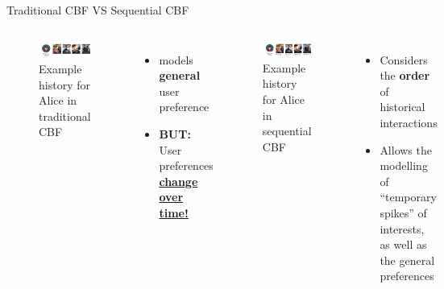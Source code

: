 \documentclass[en]{sdqbeamer}
\begin{document}
\begin{frame}{Traditional CBF VS Sequential CBF}
	\begin{columns}
		\begin{figure}
			\includegraphics[width=\textwidth]{images/Alice_history.pdf}
			\caption{Example history for Alice in traditional CBF \cite{channarongHybridBERT4RecHybridContentBased2022}}
		\end{figure}
		\begin{itemize}
			\item models \textbf{general} user preference \pause
			\item \textbf{BUT:} User preferences \underline{\textbf{change over time!}} \cite{wangSequentialRecommenderSystems2019}
		\end{itemize}

		\begin{figure}\pause
			\includegraphics[width=\textwidth]{images/Alice_seq.pdf}
			\caption{Example history for Alice in sequential CBF \cite{channarongHybridBERT4RecHybridContentBased2022}}
		\end{figure}
		\begin{itemize}
			\item Considers the \textbf{order} of historical interactions
			\item Allows the modelling of \enquote{temporary spikes} of interests, as well as the general preferences \cite{wangSequentialRecommenderSystems2019}
		\end{itemize}
	\end{columns}
\end{frame}
\end{document}
